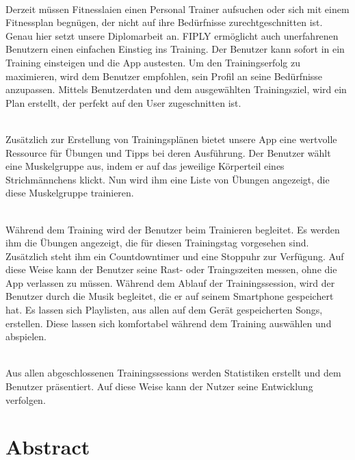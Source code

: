 \documentclass[FIPLY_base.tex]{subfiles}
\begin{document}
\ \\
Derzeit müssen Fitnesslaien einen Personal Trainer aufsuchen oder sich mit einem Fitnessplan begnügen, der nicht auf ihre Bedürfnisse zurechtgeschnitten ist. Genau hier setzt unsere Diplomarbeit an. FIPLY ermöglicht auch unerfahrenen Benutzern einen einfachen Einstieg ins Training. Der Benutzer kann sofort in ein Training einsteigen und die App austesten.
Um den Trainingserfolg zu maximieren, wird dem Benutzer empfohlen, sein Profil an seine Bedürfnisse anzupassen.
Mittels Benutzerdaten und dem ausgewählten Trainingsziel, wird ein Plan erstellt, der perfekt auf den User zugeschnitten ist.

\ \\
Zusätzlich zur Erstellung von Trainingsplänen bietet unsere App eine wertvolle Ressource für Übungen und Tipps bei deren Ausführung. Der Benutzer wählt eine Muskelgruppe aus, indem er auf das jeweilige Körperteil eines Strichmännchens klickt. 
Nun wird ihm eine Liste von Übungen angezeigt, die diese Muskelgruppe trainieren.

\ \\
Während dem Training wird der Benutzer beim Trainieren begleitet. Es werden ihm die Übungen angezeigt, die für diesen Trainingstag vorgesehen sind. Zusätzlich steht ihm ein Countdowntimer und eine Stoppuhr zur Verfügung. Auf diese Weise kann der Benutzer seine Rast- oder Traingszeiten messen, ohne die App verlassen zu müssen.  
Während dem Ablauf der Trainingssession, wird der Benutzer durch die Musik begleitet, die er auf seinem Smartphone gespeichert hat.
Es lassen sich Playlisten, aus allen auf dem Gerät gespeicherten Songs, erstellen. Diese lassen sich komfortabel während dem Training auswählen und abspielen.

\ \\
Aus allen abgeschlossenen Trainingssessions werden Statistiken erstellt und dem Benutzer präsentiert.
Auf diese Weise kann der Nutzer seine Entwicklung verfolgen. 

\section{Abstract}
\end{document}
